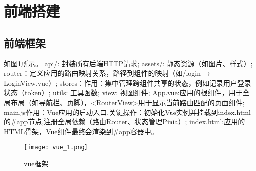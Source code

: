 \documentclass[bachelor]{thesis-uestc}
\begin{document}
\section{前端搭建}
\subsection{前端框架}
如图\ref{vue1}所示。
api/: 封装所有后端HTTP请求;
assets/: 静态资源（如图片、样式）;
router：定义应用的路由映射关系，路径到组件的映射（如/login → LoginView.vue）;
stores：作用：集中管理跨组件共享的状态，例如记录用户登录状态（token）;
utils: 工具函数;
view: 视图组件;
App.vue:应用的根组件，用于全局布局（如导航栏、页脚），<RouterView>用于显示当前路由匹配的页面组件;
main.js作用：Vue应用的启动入口,关键操作：初始化Vue实例并挂载到index.html的\#app节点,注册全局依赖（路由Router、状态管理Pinia）;
index.html:应用的HTML骨架，Vue组件最终会渲染到\#app容器中。

\begin{figure}[htbp]
    \centering
    \texttt{[image: vue\_1.png]}
    \caption{vue框架}
    \label{vue1}
\end{figure}
\end{document}
